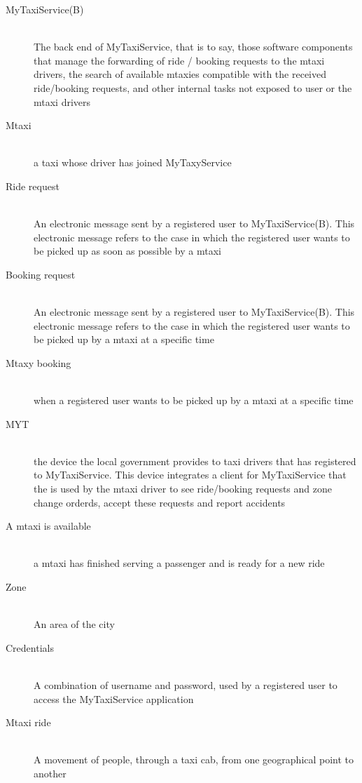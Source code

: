 \documentclass[11pt]{article} %
\begin{document}
        \begin{description}
        
         \item [MyTaxiService(B)] \hfill \\ The back end of MyTaxiService, that is to say, those software components that manage the forwarding of ride / booking requests to the mtaxi drivers, the search of available mtaxies compatible with the received ride/booking requests, and other internal
        tasks not exposed to user or the mtaxi drivers
      \item [Mtaxi] \hfill \\ a taxi whose driver has joined MyTaxyService
      \item [Ride request] \hfill \\ An electronic message sent by a registered user
        to MyTaxiService(B). This electronic message refers to the case in which the registered user wants to be picked up as soon as possible by a mtaxi
      \item [Booking request] \hfill \\ An electronic message sent by a registered user
         to MyTaxiService(B). This electronic message refers to the case in which the registered user wants to be picked up by a mtaxi at a specific time
      \item [Mtaxy booking] \hfill \\ when a registered user wants to be picked up by a mtaxi at a specific time
      \item [MYT] \hfill \\ the device the local government provides to taxi drivers that has registered to MyTaxiService. This
      device integrates a client for MyTaxiService that the is used by the mtaxi driver to see ride/booking requests and zone change orderds, accept
      these requests and report accidents
      \item [A mtaxi is available] \hfill \\ a mtaxi has finished serving a passenger and is ready for a new ride
      \item [Zone] \hfill \\ An area of the city
      \item [Credentials] \hfill \\ A combination of username and password, used by a registered user to access the MyTaxiService application
      \item [Mtaxi ride] \hfill \\ A movement of people, through a taxi cab, from one geographical point to another

\end{description}
\end{document}

